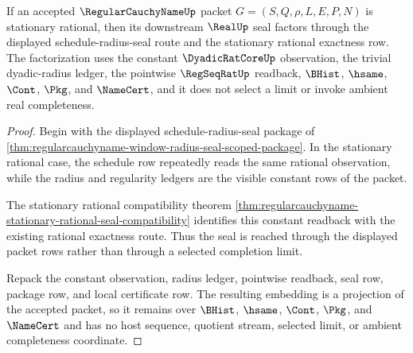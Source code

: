 \begin{theorem}
\label{thm:regularcauchyname-constant-seal-embedding}
If an accepted $\RegularCauchyNameUp$ packet $G=(S,Q,\rho,L,E,P,N)$ is stationary rational, then its downstream $\RealUp$ seal factors through the displayed schedule-radius-seal route and the stationary rational exactness row. The factorization uses the constant $\DyadicRatCoreUp$ observation, the trivial dyadic-radius ledger, the pointwise $\RegSeqRatUp$ readback, $\BHist$, $\hsame$, $\Cont$, $\Pkg$, and $\NameCert$, and it does not select a limit or invoke ambient real completeness.
\end{theorem}
\begin{proof}
Begin with the displayed schedule-radius-seal package of \autoref{thm:regularcauchyname-window-radius-seal-scoped-package}. In the stationary rational case, the schedule row repeatedly reads the same rational observation, while the radius and regularity ledgers are the visible constant rows of the packet.

The stationary rational compatibility theorem \autoref{thm:regularcauchyname-stationary-rational-seal-compatibility} identifies this constant readback with the existing rational exactness route. Thus the seal is reached through the displayed packet rows rather than through a selected completion limit.

Repack the constant observation, radius ledger, pointwise readback, seal row, package row, and local certificate row. The resulting embedding is a projection of the accepted packet, so it remains over $\BHist$, $\hsame$, $\Cont$, $\Pkg$, and $\NameCert$ and has no host sequence, quotient stream, selected limit, or ambient completeness coordinate.
\end{proof}

